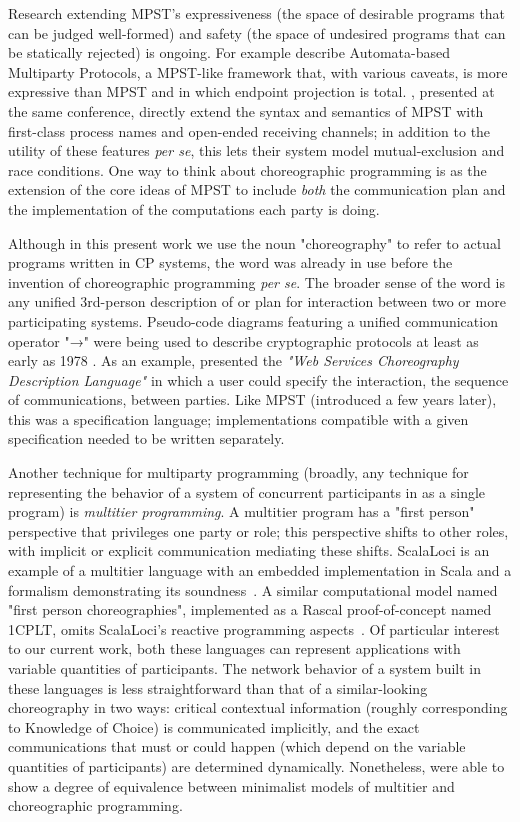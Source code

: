 Research extending MPST's expressiveness (the space of desirable programs that can be judged well-formed)
and safety (the space of undesired programs that can be statically rejected) is ongoing.
For example \cite{stutz2025} describe Automata-based Multiparty Protocols,
a MPST-like framework that, with various caveats, is more expressive than MPST and in which endpoint projection is total.
\cite{leBrun2025}, presented at the same conference, directly extend the syntax and semantics of MPST
with first-class process names and open-ended receiving channels;
in addition to the utility of these features \textit{per se}, this lets their system model mutual-exclusion and race conditions.
One way to think about choreographic programming is as the extension of the core ideas of MPST to include
\emph{both} the communication plan and the implementation of the computations each party is doing.

Although in this present work we use the noun "choreography" to refer to actual programs written in CP systems,
the word was already in use before the invention of choreographic programming \textit{per se}.
The broader sense of the word is any unified 3rd-person description of or plan for interaction between two or more participating systems.
Pseudo-code diagrams featuring a unified communication operator "→"
were being used to describe cryptographic protocols at least as early as 1978 \cite{needham_schroeder_1978}.
As an example,
\cite{w3c2005} presented the \emph{"Web Services Choreography Description Language"}
in which a user could specify the interaction, the sequence of communications, between parties.
Like MPST (introduced a few years later),
this was a specification language; implementations compatible with a given specification needed to be written separately.

Another technique for multiparty programming
(broadly, any technique for representing the behavior of a system of concurrent participants in as a single program)
is \emph{multitier programming}.
A multitier program has a "first person" perspective that privileges one party or role;
this perspective shifts to other roles, with implicit or explicit communication mediating these shifts.
ScalaLoci is an example of a multitier language with an embedded implementation in Scala and a formalism demonstrating its soundness~\cite{scalaLoci}.
A similar computational model named "first person choreographies", implemented as a Rascal proof-of-concept named 1CPLT,
omits ScalaLoci's reactive programming aspects~\cite{jongmans1cp2025}.
Of particular interest to our current work, both these languages can represent applications with variable quantities of participants.
The network behavior of a system built in these languages is less straightforward than that of a similar-looking choreography in two ways:
critical contextual information (roughly corresponding to Knowledge of Choice) is communicated implicitly,
and the exact communications that must or could happen (which depend on the variable quantities of participants) are determined dynamically.
Nonetheless, \cite{multiparty-languages} were able to show a degree of equivalence between minimalist models of multitier and choreographic programming.

